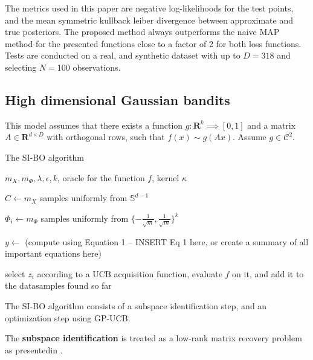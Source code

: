 \documentclass[a4paper,12pt,twoside,openright]{report}
\begin{document}
The metrics used in this paper are negative log-likelihoods for the test points, and the mean symmetric kullback leiber divergence between approximate and true posteriors.
The proposed method always outperforms the naive MAP method for the presented functions close to a factor of 2 for both loss functions.
Tests are conducted on a real, and synthetic dataset with up to $D = 318$ and selecting $N = 100$ observations. 

\subsection{High dimensional Gaussian bandits}

\citep{Djolonga2013} This model assumes that there exists a function $g : \mathbf{R}^k \implies [0, 1]$ and a matrix $A \in \mathbf{R}^{d \times D}$ with orthogonal rows, such that $f(x) \sim g(Ax) $. Assume $g \in \mathcal{C}^2$. 

\begin{algorithm}
\caption{The SI-BO algorithm \citep{Djolonga2013}}

\begin{algorithmic} 
\REQUIRE $m_X, m_{\Phi}, \lambda, \epsilon, k$, oracle for the function $f$, kernel $\kappa$ 

\STATE $C \leftarrow m_X $ samples uniformly from $\mathbb{S}^{d-1}$

\STATE $\Phi_i \leftarrow m_{\Phi}$ samples uniformly from $\{ -\frac{1}{\sqrt{m}}, \frac{1}{\sqrt{m}} \}^k$
\ENDFOR

\STATE $ y \leftarrow $ (compute using Equation 1 -- INSERT Eq 1 here, or create a summary of all important equations here)

\STATE select $z_i$ according to a UCB acquisition function, evaluate $f$ on it, and add it to the datasamples found so far

\end{algorithmic}

\end{algorithm}

The SI-BO algorithm consists of a subspace identification step, and an optimization step using GP-UCB.


The \textbf{subspace identification} is treated as a low-rank matrix recovery problem as presentedin \citep{CevherSubspaceIdentificationKrause}.
\end{document}
